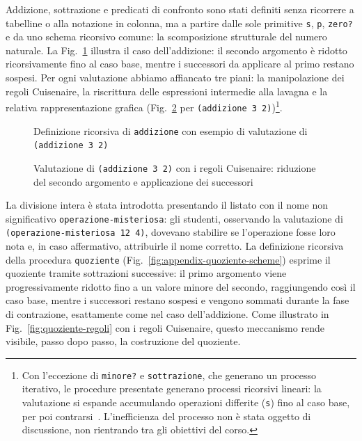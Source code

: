 \documentclass[withtimes]{easychair}
\begin{document}
Addizione, sottrazione e predicati di confronto sono stati definiti senza ricorrere a tabelline o alla notazione in colonna, ma a partire dalle sole primitive \texttt{s}, \texttt{p}, \texttt{zero?} e da uno schema ricorsivo comune: la scomposizione strutturale del numero naturale. La Fig.~\ref{fig:addizione} illustra il caso dell'addizione: il secondo argomento è ridotto ricorsivamente fino al caso base, mentre i successori da applicare al primo restano sospesi. Per ogni valutazione abbiamo affiancato tre piani: la manipolazione dei regoli Cuisenaire, la riscrittura delle espressioni intermedie alla lavagna e la relativa rappresentazione grafica (Fig.~\ref{fig:addizione-regoli} per \texttt{(addizione 3 2)})\footnote{Con l'eccezione di \texttt{minore?} e \texttt{sottrazione}, che generano un processo iterativo, le procedure presentate generano processi ricorsivi lineari: la valutazione si espande accumulando operazioni differite (\texttt{s}) fino al caso base, per poi contrarsi~\cite[par.~1.2.1]{Abelson1996}. L'inefficienza del processo non è stata oggetto di discussione, non rientrando tra gli obiettivi del corso.}.

\begin{figure}[!htb]
  \centering
  \caption{Definizione ricorsiva di \texttt{addizione} con esempio di valutazione di \texttt{(addizione 3 2)}}
  \label{fig:addizione}
\end{figure}

\begin{figure}[!htb]
    \centering
    
    \caption{Valutazione di \texttt{(addizione 3 2)} con i regoli Cuisenaire: riduzione del secondo argomento e applicazione dei successori\label{fig:addizione-regoli}}
\end{figure}

La divisione intera è stata introdotta presentando il listato con il nome non significativo \texttt{operazione-misteriosa}: gli studenti, osservando la valutazione di \texttt{(operazione-misteriosa~12~4)}, dovevano stabilire se l'operazione fosse loro nota e, in caso affermativo, attribuirle il nome corretto.
La definizione ricorsiva della procedura \texttt{quoziente} (Fig.~\ref{fig:appendix-quoziente-scheme}) esprime il quoziente tramite sottrazioni successive: il primo argomento viene progressivamente ridotto fino a un valore minore del secondo, raggiungendo così il caso base, mentre i successori restano sospesi e vengono sommati durante la fase di contrazione, esattamente come nel caso dell'addizione. Come illustrato in Fig.~\ref{fig:quoziente-regoli} con i regoli Cuisenaire, questo meccanismo rende visibile, passo dopo passo, la costruzione del quoziente.
\end{document}
